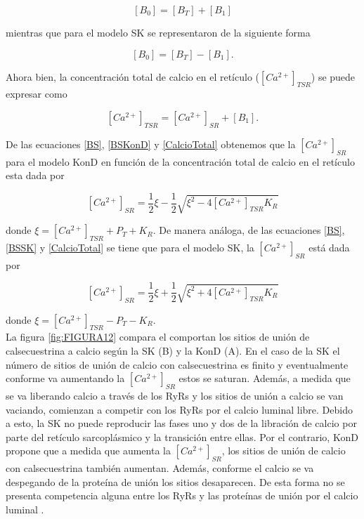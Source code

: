 \documentclass[draft]{article}
\newcommand{\Cal}{[Ca^{2+}]_{SR}}
\begin{document}
\begin{equation}\label{BSKonD}
[B_0] = [B_T] + [B_1]
\end{equation}

mientras que para el modelo SK se representaron de la siguiente forma

\begin{equation}\label{BSSK}
[B_0] = [B_T] - [B_1].
\end{equation}

Ahora bien, la concentración total de calcio en el retículo ($[Ca^{2+}]_{TSR}$) se puede expresar como

\begin{equation}\label{CalcioTotal}
[Ca^{2+}]_{TSR} = \Cal + [B_1].
\end{equation}

De las ecuaciones \ref{BS}, \ref{BSKonD} y \ref{CalcioTotal} obtenemos que la $\Cal$ para el modelo KonD en función de la concentración total de calcio en el retículo esta dada por

\begin{equation}\label{KonD}
\Cal = \frac{1}{2} \xi - \frac{1}{2} \sqrt{\xi^2 - 4[Ca^{2+}]_{TSR}K_R}
\end{equation}

donde $\xi = [Ca^{2+}]_{TSR} + P_T + K_R$. De manera análoga, de las ecuaciones \ref{BS}, \ref{BSSK} y \ref{CalcioTotal} se tiene que para el modelo SK, la $\Cal$ está dada por

\begin{equation}\label{SK}
[Ca^{2+}]_{SR} = \frac{1}{2} \xi + \frac{1}{2} \sqrt{\xi^2 + 4[Ca^{2+}]_{TSR}K_R}
\end{equation}

donde $\xi = [Ca^{2+}]_{TSR} - P_T - K_R$. \\

La figura \ref{fig:FIGURA12} compara el comportan los sitios de unión de calsecuestrina a calcio según la SK (B) y la KonD (A). En el caso de la SK el número de sitios de unión de calcio con calsecuestrina es finito y eventualmente conforme va aumentando la $\Cal$ estos se saturan. Además, a medida que se va liberando calcio a través de los RyRs y los sitios de unión a calcio se van vaciando, comienzan a competir con los RyRs por el calcio luminal libre. Debido a esto, la SK no puede reproducir las fases uno y dos de la libración de calcio por parte del retículo sarcoplásmico y la transición entre ellas. Por el contrario, KonD propone que a medida que aumenta la $\Cal$, los sitios de unión de calcio con calsecuestrina también aumentan. Además, conforme el calcio se va despegando de la proteína de unión los sitios desaparecen. De esta forma no se presenta competencia alguna entre los RyRs y las proteínas de unión por el calcio luminal \cite{Perez-Rosas2016}. \\
\end{document}
